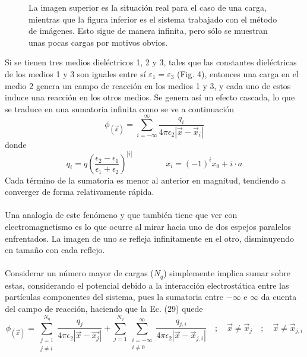 \documentclass[12pt, oneside, numbers, spanish]{ezthesis}
\numberwithin{equation}{section}
\begin{document}
\begin{figure}[H]
\centering

\caption{La imagen superior es la situación real para el caso de una carga, mientras que la figura inferior es el sistema trabajado con el método de imágenes. Esto sigue de manera infinita, pero sólo se muestran unas pocas cargas por motivos obvios.}
\end{figure}

Si se tienen tres medios dieléctricos 1, 2 y 3, tales que las constantes dieléctricas de los medios 1 y 3 son iguales entre sí $\varepsilon_1 = \varepsilon_3$ (Fig. 4), entonces una carga en el medio 2 genera un campo de reacción en los medios 1 y 3, y cada uno de estos induce una reacción en los otros medios. Se genera así un efecto cascada, lo que se traduce en una sumatoria infinita \cite{Pei-kun} como se ve a continuación
\begin{equation}
\phi_{(\vec{x})} = \sum_{i=-\infty}^\infty\frac{q_i}{4\pi\epsilon_2|\vec{x} - \vec{x}_i|}
\end{equation}
donde
\begin{equation}
q_i = q\left(\frac{\epsilon_2 - \epsilon_1}{\epsilon_1 + \epsilon_2}\right)^{|i|} \qquad\qquad x_i=(-1)^ix_0 + i\cdot a
\end{equation}
Cada término de la sumatoria es menor al anterior en magnitud, tendiendo a converger de forma relativamente rápida.\\\\
Una analogía de este fenómeno y que también tiene que ver con electromagnetismo es lo que ocurre al mirar hacia uno de dos espejos paralelos enfrentados. La imagen de uno se refleja infinitamente en el otro, disminuyendo en tamaño con cada reflejo.\\\\
Considerar un número mayor de cargas ($N_q$) simplemente implica sumar sobre estas, considerando el potencial debido a la interacción electrostática entre las partículas componentes del sistema, pues la sumatoria entre $-\infty$ e $\infty$ da cuenta del campo de reacción, haciendo que la Ec. (29) quede
\begin{equation}
\phi_{(\vec{x})} = \sum_{\substack{j = 1\\j\neq i}}^{N_q} \frac{q_j}{4\pi\epsilon_2|\vec{x} - \vec{x_j}|} + \sum_{j=1}^{N_q}\sum_{\substack{i=-\infty\\i\neq 0}}^\infty\frac{q_{j,i}}{4\pi\epsilon_2|\vec{x} - \vec{x}_{j,i}|}\quad ; \quad \vec{x} \neq \vec{x}_j\quad ; \quad \vec{x} \neq \vec{x}_{j,i}
\end{equation}
\end{document}
